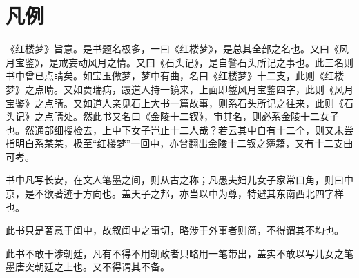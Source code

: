 \chapter*{凡例}

\begin{qute2sp}
    \Large
    \begin{parag}
        《红楼梦》旨意。是书题名极多，一曰《红楼梦》，是总其全部之名也。又曰《风月宝鉴》，是戒妄动风月之情。又曰《石头记》，是自譬石头所记之事也。此三名则书中曾已点睛矣。如宝玉做梦，梦中有曲，名曰《红楼梦》十二支，此则《红楼梦》之点睛。又如贾瑞病，跛道人持一镜来，上面即錾风月宝鉴四字，此则《风月宝鉴》之点睛。又如道人亲见石上大书一篇故事，则系石头所记之往来，此则《石头记》之点睛处。然此书又名曰《金陵十二钗》，审其名，则必系金陵十二女子也。然通部细搜检去，上中下女子岂止十二人哉？若云其中自有十二个，则又未尝指明白系某某，极至“红楼梦”一回中，亦曾翻出金陵十二钗之簿籍，又有十二支曲可考。
    \end{parag}

    \begin{parag}
        书中凡写长安，在文人笔墨之间，则从古之称；凡愚夫妇儿女子家常口角，则曰中京，是不欲著迹于方向也。盖天子之邦，亦当以中为尊，特避其东南西北四字样也。
    \end{parag}

    \begin{parag}
        此书只是著意于闺中，故叙闺中之事切，略涉于外事者则简，不得谓其不均也。
    \end{parag}

    \begin{parag}
        此书不敢干涉朝廷，凡有不得不用朝政者只略用一笔带出，盖实不敢以写儿女之笔墨唐突朝廷之上也。又不得谓其不备。
    \end{parag}
\end{qute2sp}